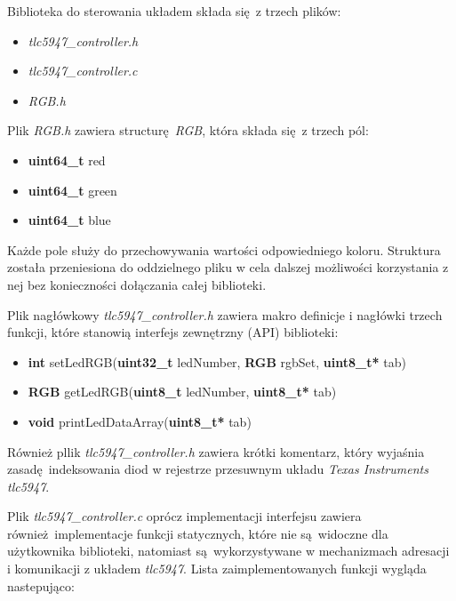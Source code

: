 \documentclass[eng,printmode]{mgr}
\begin{document}
Biblioteka do sterowania układem składa się z trzech plików:

\begin{itemize}
  \item{\emph{tlc5947\_controller.h}}
  \item{\emph{tlc5947\_controller.c}}
  \item{\emph{RGB.h}}
\end{itemize}

Plik \emph{RGB.h} zawiera structurę \emph{RGB}, która składa się z trzech pól:

\begin{itemize}[before=\ttfamily]
  \item{\textbf{uint64\_t} red}
  \item{\textbf{uint64\_t} green}
  \item{\textbf{uint64\_t} blue}
\end{itemize}

Każde pole służy do przechowywania wartości odpowiedniego koloru. Struktura została przeniesiona do oddzielnego pliku w cela dalszej możliwości korzystania z nej bez konieczności dołączania całej biblioteki.

\vspace{0.3cm}

Plik nagłówkowy \emph{tlc5947\_controller.h} zawiera makro definicje i nagłówki trzech funkcji, które stanowią interfejs zewnętrzny (API) biblioteki:

\begin{itemize}[before=\ttfamily]
  \item{\textbf{int} setLedRGB(\textbf{uint32\_t} ledNumber, \textbf{RGB} rgbSet, \textbf{uint8\_t*} tab)}
  \item{\textbf{RGB} getLedRGB(\textbf{uint8\_t} ledNumber, \textbf{uint8\_t*} tab)}
  \item{\textbf{void} printLedDataArray(\textbf{uint8\_t*} tab)}
\end{itemize}

Również pllik \emph{tlc5947\_controller.h} zawiera krótki komentarz, który wyjaśnia zasadę indeksowania diod w rejestrze przesuwnym układu \emph{Texas Instruments tlc5947}. 

\vspace{0.3cm}

Plik \emph{tlc5947\_controller.c} oprócz implementacji interfejsu zawiera również implementacje funkcji statycznych, które nie są widoczne dla użytkownika biblioteki, natomiast są wykorzystywane w mechanizmach adresacji i komunikacji z układem \emph{tlc5947}. Lista zaimplementowanych funkcji wygląda nastepująco:
\end{document}
